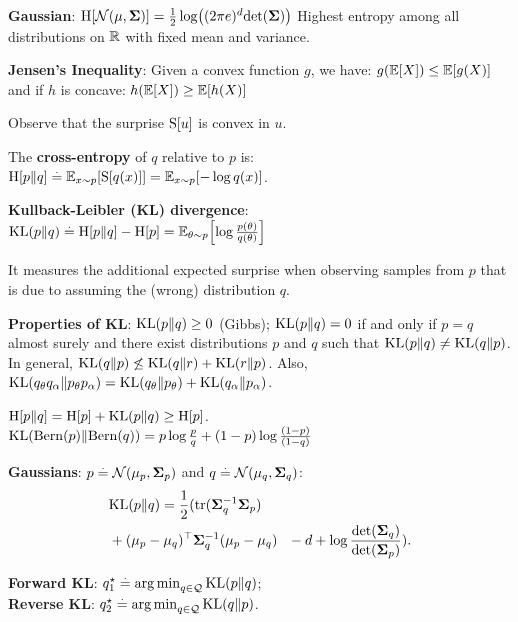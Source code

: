 \textbf{Gaussian}: $\H{\N{\vmu}{\mSigma}} = \frac{1}{2} \log \parentheses*{(2 \pi e)^d \det{\mSigma}}$
Highest entropy among all distributions on $\mathbb{R}$ with fixed mean and variance.
\begin{framed}
    \textbf{Jensen's Inequality}: Given a convex function $g$, we have:
    $g(\E{X}) \leq \E{g(X)}$ and if $h$ is concave:  $h(\E{X}) \geq \E{h(X)}$
\end{framed}
Observe that the surprise $\S{u}$ is convex in $u$.
\begin{framed}
    The \textbf{cross-entropy} of $q$ relative to $p$ is: \\
    $\crH{p}{q} \defeq \E[x \sim p]{\S{q(x)}} = \E[x \sim p]{- \log q(x)}$.
\end{framed}
\begin{framed}
    \textbf{Kullback-Leibler (KL) divergence}:
    $\KL{p}{q} \defeq \crH{p}{q} - \H{p} = \E[\vtheta \sim p]{\log \frac{p(\vtheta)}{q(\vtheta)}}$
\end{framed}
It measures the additional expected surprise when observing samples from $p$ that is due to assuming the (wrong) distribution $q$.
\begin{framed}
    \textbf{Properties of KL}:
    $\KL{p}{q} \geq 0$ (Gibbs); $\KL{p}{q} = 0$ if and only if $p = q$ almost surely and there exist distributions $p$ and $q$ such that $\KL{p}{q} \neq \KL{q}{p}$. In general, \(\KL{q}{p}\not\leq \KL{q}{r}+\KL{r}{p}\). Also, \(\KL{q_\theta q_\alpha}{p_\theta p_\alpha}=\KL{q_\theta}{p_\theta}+\KL{q_\alpha}{p_\alpha}\).
\end{framed}
$\crH{p}{q} = \H{p} + \KL{p}{q} \geq \H{p}$.\\
$\KL{\Bern{p}}{\Bern{q}} = p \log \frac{p}{q} + (1-p) \log \frac{(1-p)}{(1-q)}$  \\
\begin{framed}
    \textbf{Gaussians}: ${p \defeq \N{\vmu_p}{\mSigma_p}}$ and ${q \defeq \N{\vmu_q}{\mSigma_q}}$: \\
    \begin{align*}
    &\KL{p}{q} = \frac{1}{2} (\mathrm{tr}(\inv{\mSigma_q} \mSigma_p) \\ &+ \transpose{(\vmu_p - \vmu_q)} \inv{\mSigma_q} (\vmu_p - \vmu_q) \phantom{\frac12}  - d + \log \frac{\det{\mSigma_q}}{\det{\mSigma_p}}).
    \end{align*}
\end{framed}
\textbf{Forward KL}: $\qs_1 \defeq \argmin_{q \in \spQ} \KL{p}{q}$;\\
\textbf{Reverse KL}: $\qs_2 \defeq \argmin_{q \in \spQ} \KL{q}{p}$.\\
